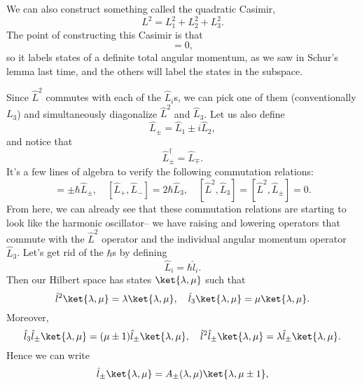 We can also construct something called the quadratic Casimir,
\begin{equation}
    L^2 = L_1^2 + L_2^2 + L_3^2.
\end{equation}
The point of constructing this Casimir is that
\begin{equation}
    [\hat L^2, \hat L_i]=0,
\end{equation}
so it labels states of a definite total angular momentum, as we saw in Schur's lemma last time, and the others will label the states in the subspace.

Since $\hat L^2$ commutes with each of the $\hat L_i$s, we can pick one of them (conventionally $L_3$) and simultaneously diagonalize $\hat L^2$ and $\hat L_3$. Let us also define
\begin{equation}
    \hat L_\pm = \hat L_1 \pm i\hat L_2,
\end{equation}
and notice that
\begin{equation}
    \hat L_\pm^\dagger = \hat L_\mp.
\end{equation}
It's a few lines of algebra to verify the following commutation relations:
\begin{equation}
    [\hat L_3, \hat L_\pm] = \pm \hbar \hat L_\pm, \quad [\hat L_+,\hat L_-] = 2\hbar \hat L_3, \quad [\hat L^2, \hat L_3]=[\hat L^2, \hat L_\pm] =0.
\end{equation}
From here, we can already see that these commutation relations are starting to look like the harmonic oscillator-- we have raising and lowering operators that commute with the $\hat L^2$ operator and the individual angular momentum operator $\hat L_3$.
Let's get rid of the $\hbar$s by defining
\begin{equation}
    \hat L_i = \hbar \hat l_i.
\end{equation}
Then our Hilbert space has states $\ket{\lambda,\mu}$ such that
\begin{equation}
    \hat l^2\ket{\lambda,\mu} = \lambda \ket{\lambda,\mu},\quad \hat l_3 \ket{\lambda,\mu} = \mu \ket{\lambda,\mu}.
\end{equation}
Moreover,
\begin{equation}
    \hat l_3 \hat l_\pm \ket{\lambda,\mu} = (\mu\pm 1) \hat l_\pm \ket{\lambda,\mu},\quad \hat l^2 \hat l_\pm \ket{\lambda,\mu} = \lambda \hat l_\pm \ket{\lambda,\mu}.
\end{equation}
Hence we can write
\begin{equation}
    \hat l_\pm \ket{\lambda,\mu} = A_\pm (\lambda,\mu) \ket{\lambda,\mu \pm 1},
\end{equation}
